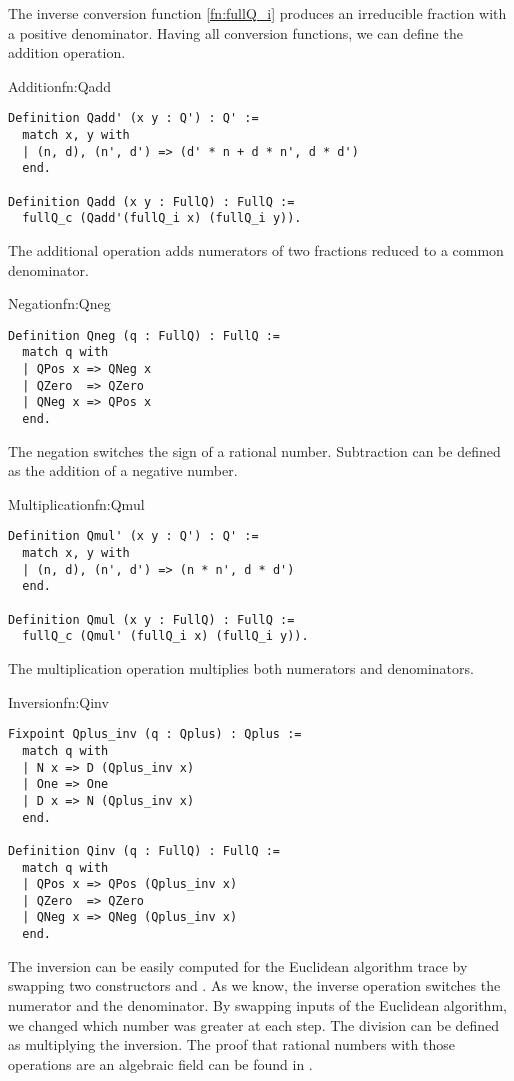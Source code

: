 The inverse conversion function \ref{fn:fullQ_i} produces an irreducible fraction with a positive denominator. Having all conversion functions, we can define the addition operation.
\begin{func}{Addition}{fn:Qadd}
\begin{verbatim}
Definition Qadd' (x y : Q') : Q' :=
  match x, y with
  | (n, d), (n', d') => (d' * n + d * n', d * d')
  end.

Definition Qadd (x y : FullQ) : FullQ :=
  fullQ_c (Qadd'(fullQ_i x) (fullQ_i y)).
\end{verbatim}
\end{func}
The additional operation adds numerators of two fractions reduced to a common denominator.
\begin{func}{Negation}{fn:Qneg}
\begin{verbatim}
Definition Qneg (q : FullQ) : FullQ :=
  match q with
  | QPos x => QNeg x
  | QZero  => QZero
  | QNeg x => QPos x
  end.
\end{verbatim}
\end{func}
The negation switches the sign of a rational number. Subtraction can be defined as the addition of a negative number.
\begin{func}{Multiplication}{fn:Qmul}
\begin{verbatim}
Definition Qmul' (x y : Q') : Q' :=
  match x, y with
  | (n, d), (n', d') => (n * n', d * d')
  end.

Definition Qmul (x y : FullQ) : FullQ :=
  fullQ_c (Qmul' (fullQ_i x) (fullQ_i y)).
\end{verbatim}
\end{func}
The multiplication operation multiplies both numerators and denominators.
\begin{func}[D]{Inversion}{fn:Qinv}
\begin{verbatim}
Fixpoint Qplus_inv (q : Qplus) : Qplus :=
  match q with
  | N x => D (Qplus_inv x)
  | One => One
  | D x => N (Qplus_inv x)
  end.

Definition Qinv (q : FullQ) : FullQ :=
  match q with
  | QPos x => QPos (Qplus_inv x)
  | QZero  => QZero
  | QNeg x => QNeg (Qplus_inv x)
  end.
\end{verbatim}
\end{func}
The inversion can be easily computed for the Euclidean algorithm trace by swapping two constructors  and . As we know, the inverse operation switches the numerator and the denominator. By swapping inputs of the Euclidean algorithm, we changed which number was greater at each step. The division can be defined as multiplying the inversion. The proof that rational numbers with those operations are an algebraic field can be found in .
